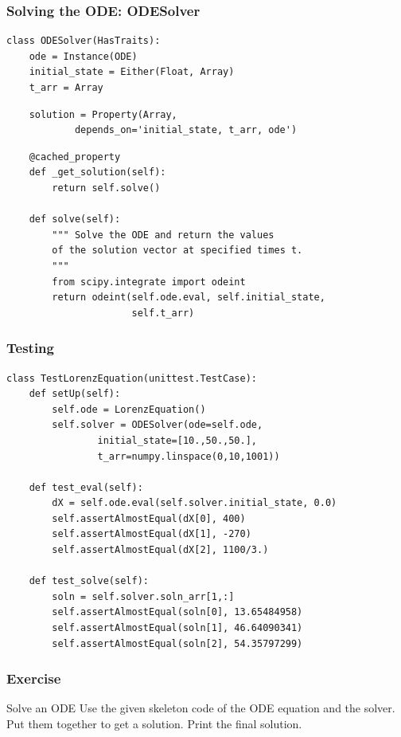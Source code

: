\documentclass[14pt,compress]{beamer}
\newcounter{time}
\begin{document}
\begin{frame}
\frametitle{Solving the ODE: ODESolver}
\footnotesize
\begin{lstlisting}
class ODESolver(HasTraits):
    ode = Instance(ODE)
    initial_state = Either(Float, Array)
    t_arr = Array
\end{lstlisting}
\pause
\begin{lstlisting}
    solution = Property(Array, 
            depends_on='initial_state, t_arr, ode')
\end{lstlisting}
\pause
\begin{lstlisting}
    @cached_property
    def _get_solution(self):
        return self.solve()

    def solve(self):
        """ Solve the ODE and return the values 
        of the solution vector at specified times t. 
        """
        from scipy.integrate import odeint
        return odeint(self.ode.eval, self.initial_state, 
                      self.t_arr)
\end{lstlisting}
\end{frame}

\begin{frame}
\frametitle{Testing}
\footnotesize
\begin{lstlisting}
class TestLorenzEquation(unittest.TestCase):
    def setUp(self):
        self.ode = LorenzEquation()
        self.solver = ODESolver(ode=self.ode, 
                initial_state=[10.,50.,50.], 
                t_arr=numpy.linspace(0,10,1001))

    def test_eval(self):
        dX = self.ode.eval(self.solver.initial_state, 0.0)
        self.assertAlmostEqual(dX[0], 400)
        self.assertAlmostEqual(dX[1], -270)
        self.assertAlmostEqual(dX[2], 1100/3.)

    def test_solve(self):
        soln = self.solver.soln_arr[1,:]
        self.assertAlmostEqual(soln[0], 13.65484958)
        self.assertAlmostEqual(soln[1], 46.64090341)
        self.assertAlmostEqual(soln[2], 54.35797299)
\end{lstlisting}
\end{frame}

\begin{frame}[plain]
    \frametitle{Exercise}
  \begin{block}{Solve an ODE}
      Use the given skeleton code of the ODE equation and the solver.
      Put them together to get a solution.  Print the final solution.
  \end{block}  
\end{frame}
\end{document}
